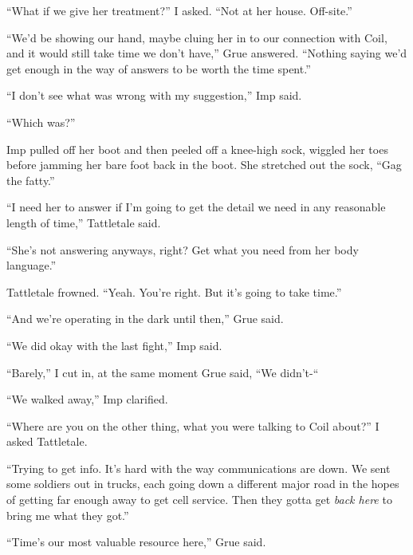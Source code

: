 ``What if we give her treatment?''  I asked.  ``Not at her house.  Off-site.''



``We'd be showing our hand, maybe cluing her in to our connection with Coil, and it would still take time we don't have,'' Grue answered.  ``Nothing saying we'd get enough in the way of answers to be worth the time spent.''



``I don't see what was wrong with my suggestion,'' Imp said.



``Which was?''



Imp pulled off her boot and then peeled off a knee-high sock, wiggled her toes before jamming her bare foot back in the boot.  She stretched out the sock, ``Gag the fatty.''



``I need her to answer if I'm going to get the detail we need in any reasonable length of time,'' Tattletale said.



``She's not answering anyways, right?  Get what you need from her body language.''



Tattletale frowned.  ``Yeah.  You're right.  But it's going to take time.''



``And we're operating in the dark until then,'' Grue said.



``We did okay with the last fight,'' Imp said.



``Barely,'' I cut in, at the same moment Grue said, ``We didn't-``



``We walked away,'' Imp clarified.



``Where are you on the other thing, what you were talking to Coil about?''  I asked Tattletale.



``Trying to get info.  It's hard with the way communications are down.  We sent some soldiers out in trucks, each going down a different major road in the hopes of getting far enough away to get cell service.  Then they gotta get \emph{back here }to bring me what they got.''



``Time's our most valuable resource here,'' Grue said.



